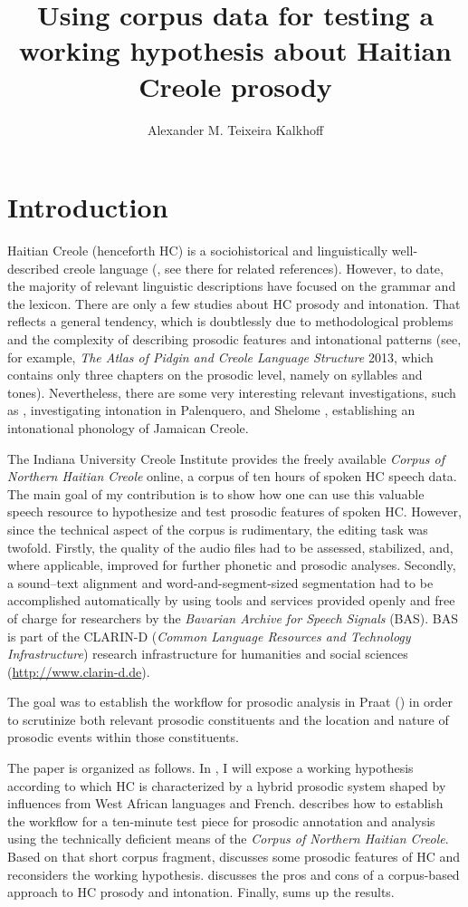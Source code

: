 \documentclass[output=paper]{langsci/langscibook}
\author{Alexander M. Teixeira Kalkhoff\affiliation{Universität Regensburg}}
\title{Using corpus data for testing a working hypothesis about Haitian Creole prosody}
\begin{document}
\label{chap:kal}
\section{Introduction}

Haitian Creole (henceforth HC) is a sociohistorical and linguistically well-described creole language (\citealt{Fattier2013,Valdman2014}, see there for related references). However, to date, the majority of relevant linguistic descriptions have focused on the grammar and the lexicon. There are only a few studies about HC prosody and intonation. That reflects a general tendency, which is doubtlessly due to methodological problems and the complexity of describing prosodic features and intonational patterns (see, for example, \textit{The Atlas of Pidgin and Creole Language Structure} 2013, which contains only three chapters on the prosodic level, namely on syllables and tones). Nevertheless, there are some very interesting relevant investigations, such as \citet{Hualde2008palenquero}, investigating intonation in Palenquero, and Shelome \citet{Gooden2014}, establishing an intonational phonology of Jamaican Creole.

The Indiana University Creole Institute provides the freely available \textit{Corpus of Northern Haitian Creole} online, a corpus of ten hours of spoken HC speech data. The main goal of my contribution is to show how one can use this valuable speech resource to hypothesize and test prosodic features of spoken HC. However, since the technical aspect of the corpus is rudimentary, the editing task was twofold. Firstly, the quality of the audio files had to be assessed, stabilized, and, where applicable, improved for further phonetic and prosodic analyses. Secondly, a sound–text alignment and word-and-segment-sized segmentation had to be accomplished automatically by using tools and services provided openly and free of charge for researchers by the \textit{Bavarian Archive for Speech Signals} (BAS). BAS is part of the CLARIN-D (\textit{Common Language Resources and Technology Infrastructure}) research infrastructure for humanities and social sciences (\url{http://www.clarin-d.de}). 

The goal was to establish the workflow for prosodic analysis in Praat (\citealt{Boersma.praat}) in order to scrutinize both relevant prosodic constituents and the location and nature of prosodic events within those constituents.

The paper is organized as follows. In , I will expose a working hypothesis according to which HC is characterized by a hybrid prosodic system shaped by influences from West African languages and French.  describes how to establish the workflow for a ten-minute test piece for prosodic annotation and analysis using the technically deficient means of the \textit{Corpus of Northern Haitian Creole}. Based on that short corpus fragment,  discusses some prosodic features of HC and reconsiders the working hypothesis.  discusses the pros and cons of a corpus-based approach to HC prosody and intonation. Finally,  sums up the results.
\end{document}
